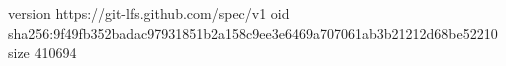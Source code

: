 version https://git-lfs.github.com/spec/v1
oid sha256:9f49fb352badac97931851b2a158c9ee3e6469a707061ab3b21212d68be52210
size 410694
